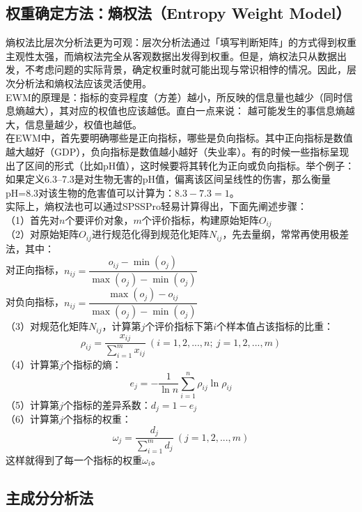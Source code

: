 \documentclass[11pt,a4paper]{article}
\begin{document}
\subsection{权重确定方法：熵权法（Entropy Weight Model）}
\indent\setlength{\parindent}{2em}熵权法比层次分析法更为可观：层次分析法通过「填写判断矩阵」的方式得到权重主观性太强，而熵权法完全从客观数据出发得到权重。但是，熵权法只从数据出发，不考虑问题的实际背景，确定权重时就可能出现与常识相悖的情况。因此，层次分析法和熵权法应该灵活使用。\\
EWM的原理是：指标的变异程度（方差）越小，所反映的信息量也越少（同时信息熵越大），其对应的权值也应该越低。直白一点来说： 越可能发生的事信息熵越大，信息量越少，权值也越低。\\
\indent\setlength{\parindent}{2em}在EWM中，首先要明确哪些是正向指标，哪些是负向指标。其中正向指标是数值越大越好（GDP），负向指标是数值越小越好（失业率）。有的时候一些指标呈现出了区间的形式（比如pH值），这时候要将其转化为正向或负向指标。举个例子：如果定义6.3--7.3是对生物无害的pH值，偏离该区间呈线性的伤害，那么衡量pH=8.3对该生物的危害值可以计算为：$8.3-7.3=1$。\\
实际上，熵权法也可以通过SPSSPro轻易计算得出，下面先阐述步骤：\\
（1）首先对$n$个要评价对象，$m$个评价指标，构建原始矩阵$O_{ij}$\\
（2）对原始矩阵$O_{ij}$进行规范化得到规范化矩阵$N_{ij}$，先去量纲，常常再使用极差法，其中：\\
对正向指标，$n_{ij}=\dfrac{{o_{ij}-\min(o_{j})}}{{\max(o_{j})-\min(o_{j})}}$\\
对负向指标，$n_{ij}=\dfrac{\max(o_{j})-{o_{ij}}}{{\max(o_{j})-\min(o_{j})}}$\\
（3）对规范化矩阵$N_{ij}$，计算第$j$个评价指标下第$i$个样本值占该指标的比重：
\begin{equation*}
	\rho_{ij}=\dfrac{x_{ij}}{\sum_{i=1}^{m}x_{ij}} \ (i=1,2,...,n;\ j=1,2,...,m)
\end{equation*}
（4）计算第$j$个指标的熵：
\begin{equation*}
	e_j=-\dfrac{1}{\ln n}\sum_{i=1}^{n}\rho_{ij}\ln\rho_{ij}
\end{equation*}
（5）计算第$j$个指标的差异系数：$d_j=1-e_j$\\
（6）计算第$j$个指标的权重：
\begin{equation*}
	\omega_j=\dfrac{d_j}{\sum_{i=1}^{m}d_j}\ (j=1,2,...,m)
\end{equation*}
这样就得到了每一个指标的权重$\omega_i$。
\subsection{主成分分析法}
\newpage
\end{document}

